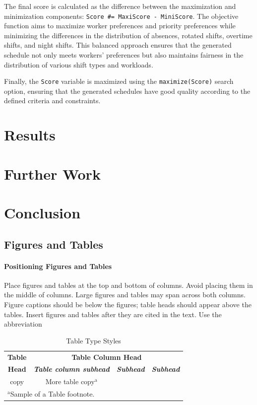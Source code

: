 \documentclass[conference]{IEEEtran}
\begin{document}
The final score is calculated as the difference between the maximization and minimization components: \texttt{Score \#= MaxiScore - MiniScore}. The objective function aims to maximize worker preferences and priority preferences while minimizing the differences in the distribution of absences, rotated shifts, overtime shifts, and night shifts. This balanced approach ensures that the generated schedule not only meets workers' preferences but also maintains fairness in the distribution of various shift types and workloads.

Finally, the \texttt{Score} variable is maximized using the  \texttt{maximize(Score)} search option, ensuring that the generated schedules have good quality according to the defined criteria and constraints.

\section{Results}
\label{section:results}

\section{Further Work}
\label{section:further-work}



\section{Conclusion}
\label{section:conclusion}


\color{red}
\subsection{Figures and Tables}
\paragraph{Positioning Figures and Tables} Place figures and tables at the top and 
bottom of columns. Avoid placing them in the middle of columns. Large 
figures and tables may span across both columns. Figure captions should be 
below the figures; table heads should appear above the tables. Insert 
figures and tables after they are cited in the text. Use the abbreviation 

\begin{table}[htbp]
\caption{Table Type Styles}
\begin{center}
\begin{tabular}{|c|c|c|c|}
\hline
\textbf{Table}&\multicolumn{3}{|c|}{\textbf{Table Column Head}} \\
\cline{2-4} 
\textbf{Head} & \textbf{\textit{Table column subhead}}& \textbf{\textit{Subhead}}& \textbf{\textit{Subhead}} \\
\hline
copy& More table copy$^{\mathrm{a}}$& &  \\
\hline
\multicolumn{4}{l}{$^{\mathrm{a}}$Sample of a Table footnote.}
\end{tabular}
\label{tab1}
\end{center}
\end{table}
\end{document}

